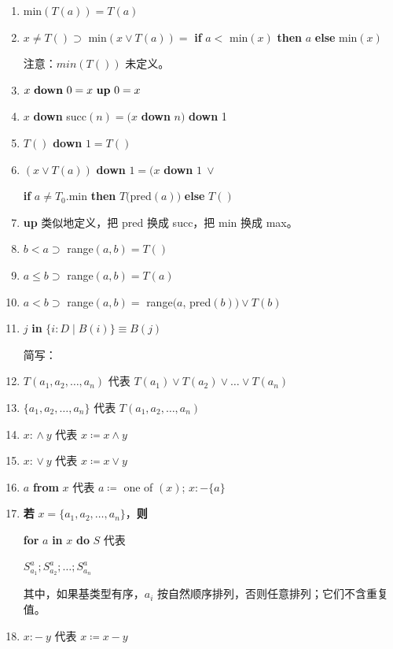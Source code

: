 \documentclass[twoside,11pt,fontset=none]{ctexbook}
\begin{document}
\begin{enumerate}[wide, nosep, label=(\arabic*)]
	\item min$(T(a)) = T(a)$
	\item $x \neq T() \supset$ min$(x \lor T(a)) =$ \textbf{if} $a <$ min$(x)$ \textbf{then} $a$ \textbf{else} min$(x)$

	\noindent
	注意：$min(T())$ 未定义。

	\item $x \text{ \textbf{down} } 0 = x \text{ \textbf{up} } 0 = x$
	\item $x$ \textbf{down} succ$(n) = (x$ \textbf{down} $n)$ \textbf{down} 1
	\item $T()$ \textbf{down} $1 = T()$
	\item $(x \lor T(a))$ \textbf{down} $1 = (x$ \textbf{down} $1\ \lor$
	
	\quad \textbf{if} $a \neq T_0$.min \textbf{then} $T($pred$(a))$ \textbf{else} $T()$
	
	\item[(27)\textendash{}(28)] \textbf{up} 类似地定义，把 pred 换成 succ，把 min 换成 max。
	\setcounter{enumi}{28}

	\item $b < a \supset$ range$(a, b) = T()$
	\item $a \leqslant b \supset$ range$(a, b) = T(a)$
	\item $a < b \supset$ range$(a, b) =$ range$(a$, pred$(b)) \lor T(b)$
	\item $j$ \textbf{in} $\{i:D \mid B(i)\} \equiv B(j)$

	\noindent
	简写：
	
	\item $T(a_1, a_2, \dots, a_n)$ 代表 $T(a_1) \lor T(a_2) \lor \dots \lor T(a_n)$
	\item $\{a_1, a_2, \dots, a_n\}$ 代表 $T(a_1, a_2, \dots, a_n)$
	\item $x$: $\land\ y$ 代表 $x \coloneq x \land y$
	\item $x$: $\lor\ y$ 代表 $x \coloneq x \lor y$
	\item $a$ \textbf{from} $x$ 代表 $a \coloneq$ one of $(x)$; $x: - \{a\}$
	\item \textbf{若} $x = \{a_1, a_2, \dots, a_n\}$，\textbf{则}
	
	\qquad\quad \textbf{for} $a$ \textbf{in} $x$ \textbf{do} $S$ 代表
	
	\qquad\quad \quad $S_{a_1}^a; S_{a_2}^a ; \dots; S_{a_n}^a$
	
	\noindent
	其中，如果基类型有序，$a_i$ 按自然顺序排列，否则任意排列；它们不含重复值。
	
	\item $x: -\ y$ 代表 $x \coloneq x - y$
\end{enumerate}
\end{document}
